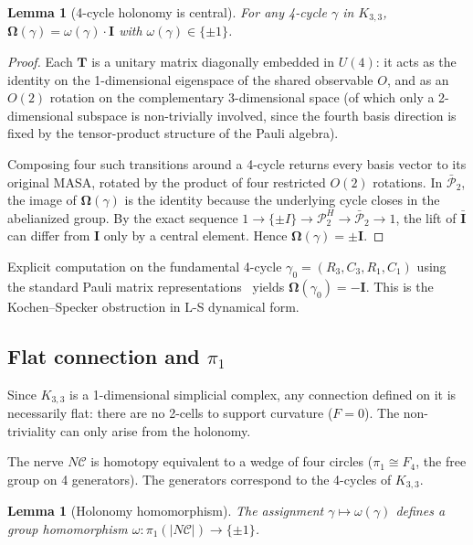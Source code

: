 \documentclass[11pt]{article}
\newtheorem{lemma}[theorem]{Lemma}
\begin{document}
\begin{lemma}[4-cycle holonomy is central]
\label{lem:4cycle-central}
For any 4-cycle $\gamma$ in $K_{3,3}$,
$\mathbf{\Omega}(\gamma) = \omega(\gamma) \cdot \mathbf{I}$ with
$\omega(\gamma) \in \{\pm 1\}$.
\end{lemma}

\begin{proof}
Each $\mathbf{T}$ is a unitary matrix diagonally embedded in $U(4)$: it acts as the
identity on the 1-dimensional eigenspace of the shared observable $O$, and as an
$O(2)$ rotation on the complementary 3-dimensional space (of which only a
2-dimensional subspace is non-trivially involved, since the fourth basis direction
is fixed by the tensor-product structure of the Pauli algebra).

Composing four such transitions around a 4-cycle returns every basis vector to its
original MASA, rotated by the product of four restricted $O(2)$ rotations. In
$\bar{\mathcal{P}}_2$, the image of $\mathbf{\Omega}(\gamma)$ is the identity
because the underlying cycle closes in the abelianized group. By the exact sequence
$1 \to \{\pm I\} \to \mathcal{P}_2^H \to \bar{\mathcal{P}}_2 \to 1$, the lift
of $\bar{\mathbf{I}}$ can differ from $\mathbf{I}$ only by a central element.
Hence $\mathbf{\Omega}(\gamma) = \pm \mathbf{I}$.
\end{proof}

Explicit computation on the fundamental 4-cycle $\gamma_0 = (R_3, C_3, R_1, C_1)$
using the standard Pauli matrix representations~\cite{Peres90,Mermin90} yields
$\mathbf{\Omega}(\gamma_0) = -\mathbf{I}$. This is the Kochen--Specker obstruction
in L-S dynamical form.

\subsection{Flat connection and $\pi_1$}
\label{sec:flat-connection}

Since $K_{3,3}$ is a 1-dimensional simplicial complex, any connection defined on
it is necessarily flat: there are no 2-cells to support curvature ($F = 0$).
The non-triviality can only arise from the holonomy.

The nerve $N\mathcal{C}$ is homotopy equivalent to a wedge of four circles
($\pi_1 \cong F_4$, the free group on 4 generators). The generators correspond
to the 4-cycles of $K_{3,3}$.

\begin{lemma}[Holonomy homomorphism]
\label{lem:holonomy-hom}
The assignment $\gamma \mapsto \omega(\gamma)$ defines a group homomorphism
$\omega: \pi_1(|N\mathcal{C}|) \to \{\pm 1\}$.
\end{lemma}
\end{document}
